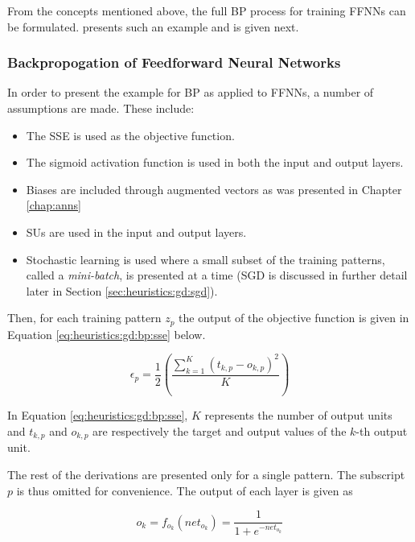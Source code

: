 From the concepts mentioned above, the full \ac{BP} process for training \acp{FFNN} can be formulated. \citeauthor{ref:engelbrecht:2007} \cite{ref:engelbrecht:2007} presents such an example and is given next.

\subsubsection*{Backpropogation of Feedforward Neural Networks}

In order to present the example for \ac{BP} as applied to \acp{FFNN}, a number of assumptions are made. These include:

\begin{itemize}
      \item The \ac{SSE} is used as the objective function.
      \item The sigmoid activation function is used in both the input and output layers.
      \item Biases are included through augmented vectors as was presented in Chapter \ref{chap:anns}
      \item \Acp{SU} are used in the input and output layers.
      \item Stochastic learning is used where a small subset of the training patterns, called a \textit{mini-batch}, is presented at a time (\ac{SGD} is discussed in further detail later in Section \ref{sec:heuristics:gd:sgd}).
\end{itemize}

Then, for each training pattern $z_{p}$ the output of the objective function is given in Equation \ref{eq:heuristics:gd:bp:sse} below.

\begin{equation}
      \label{eq:heuristics:gd:bp:sse}
      \epsilon_{p} = \frac{1}{2}\left(\frac{\sum^{K}_{k=1}(t_{k,p} - o_{k,p})^{2}}{K}\right)
\end{equation}

In Equation \ref{eq:heuristics:gd:bp:sse}, $K$ represents the number of output units and $t_{k,p}$ and $o_{k,p}$ are respectively the target and output values of the $k$-th output unit.

The rest of the derivations are presented only for a single pattern. The subscript $p$ is thus omitted for convenience. The output of each layer is given as

\begin{equation}
      \label{eq:heuristics:gd:bp:output_1}
      o_{k} = f_{o_{k}}(net_{o_{k}}) = \frac{1}{1 + e^{-net_{o_{k}}}}
\end{equation}

